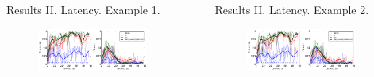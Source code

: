 \documentclass[final,t,overlay, xcolor=table, sans, mathserif]{beamer}
\begin{document}
\begin{frame}{}
\begin{columns}[t]
\begin{column}{.65\linewidth}
\begin{columns}
\begin{block}{Results II. Latency. Example 1.}
\begin{figure}
\includegraphics[width=0.85\textwidth]{figures/Patient_2_latency.pdf}
\end{figure}
\end{block}
\begin{block}{Results II. Latency. Example 2.}
\begin{figure}
\includegraphics[width=0.85\textwidth]{figures/Patient_2_latency.pdf}
\end{figure}
\end{block}
\end{columns}


\end{column}
\end{columns}
\end{frame}
\end{document}
